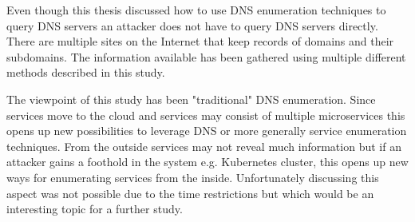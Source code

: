 Even though this thesis discussed how to use DNS enumeration techniques to query DNS servers an attacker does not have to query DNS servers directly. There are multiple sites on the Internet that keep records of domains and their subdomains. The information available has been gathered using multiple different methods described in this study.

The viewpoint of this study has been "traditional" DNS enumeration. Since services move to the cloud and services may consist of multiple microservices this opens up new possibilities to leverage DNS or more generally service enumeration techniques. From the outside services may not reveal much information but if an attacker gains a foothold in the system e.g. Kubernetes cluster, this opens up new ways for enumerating services from the inside. Unfortunately discussing this aspect was not possible due to the time  restrictions but which would be an interesting topic for a further study.


